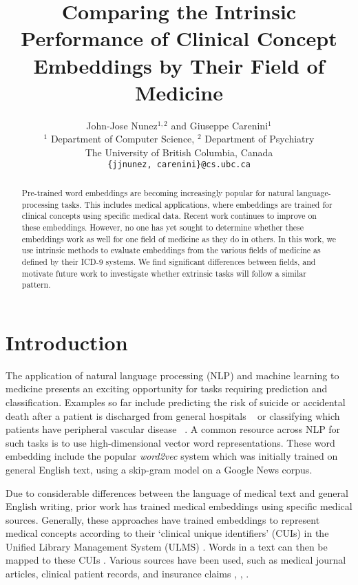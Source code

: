 \documentclass[11pt,a4paper]{article}
\title{Comparing the Intrinsic Performance of Clinical Concept Embeddings by Their Field of Medicine}
\author{John-Jose Nunez$^{1,2}$ and Giuseppe Carenini$^1$\\
  $^1$ Department of Computer Science, %
  $^2$ Department of Psychiatry\\
  The University of British Columbia, Canada \\
  {\tt \{jjnunez, carenini\}@cs.ubc.ca}}
\date{}
\begin{document}
\maketitle
\begin{abstract}
	Pre-trained word embeddings are becoming increasingly popular for natural language-processing tasks. This includes medical applications, where embeddings are trained for clinical concepts using specific medical data. Recent work continues to improve on these embeddings. However, no one has yet sought to determine whether these embeddings work as well for one field of medicine as they do in others. In this work, we use intrinsic methods to evaluate embeddings from the various fields of medicine as defined by their ICD-9 systems. We find significant differences between fields, and motivate future work to investigate whether extrinsic tasks will follow a similar pattern. 
\end{abstract}

\section{Introduction}


The application of natural language processing (NLP) and machine learning to medicine presents an exciting opportunity for tasks requiring prediction and classification. Examples so far include predicting the risk of suicide or accidental death after a patient is discharged from general hospitals ~\cite{mccoyImprovingPredictionSuicide2016} or classifying which patients have peripheral vascular disease ~\cite{afzalMiningPeripheralArterial2017}. A common resource across NLP for such tasks is to use high-dimensional vector word representations. These word embedding include the popular \emph{word2vec} system \cite{mikolovEfficientEstimationWord2013} which was initially trained on general English text, using a skip-gram model on a Google News corpus.

Due to considerable differences between the language of medical text and general English writing, prior work has trained medical embeddings using specific medical sources. Generally, these approaches have trained embeddings to represent medical concepts according to their `clinical unique identifiers' (CUIs) in the Unified Library Management System (ULMS) \cite{bodenreiderUnifiedMedicalLanguage2004}. Words in a text can then be mapped to these CUIs \cite{yuShortIntroductionNILE2013}. Various sources have been used, such as medical journal articles, clinical patient records, and insurance claims \cite{devineMedicalSemanticSimilarity2014}, \cite{minarro-gimenezExploringApplicationDeep2014},  \cite{choiLearningLowDimensionalRepresentations2016}.  
\end{document}
